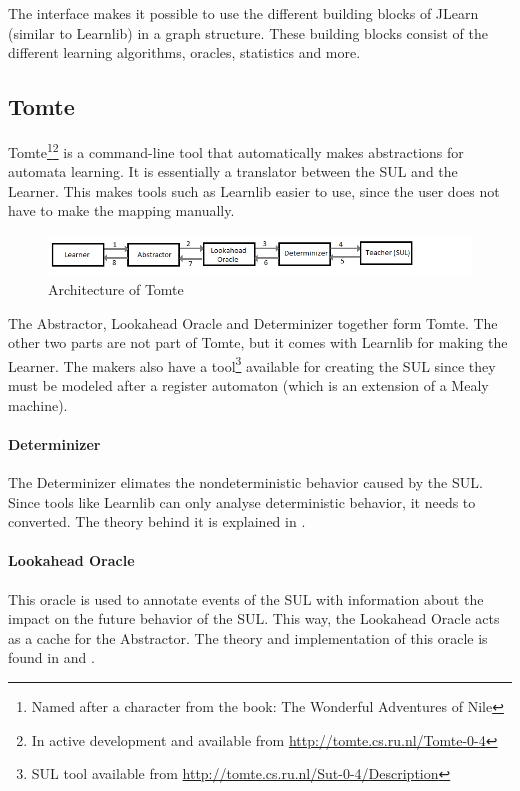 \documentclass[multi,crop=false,class=article]{standalone}
\begin{document}
The interface makes it possible to use the different building blocks of 
JLearn (similar to Learnlib) in a graph structure. These building blocks 
consist of the different learning algorithms, oracles, statistics and more. 


\subsection{Tomte}
\label{ssec:tomte}

Tomte\footnote{Named after a character from the book: The Wonderful Adventures 
of Nile}\footnote{In active development and available from
\url{http://tomte.cs.ru.nl/Tomte-0-4}} is a command-line tool that 
automatically makes abstractions for automata learning.  It is essentially a 
translator between the SUL and the Learner. This makes 
tools such as Learnlib easier to use, since the user does not have to make the 
mapping manually.

\begin{figure}[!h]
	\includegraphics[width=\textwidth]{Tool_images/tomte_network.png}
	\caption{Architecture of Tomte}
	\label{fig:tomte_arch_interaction}
\end{figure}

The Abstractor, Lookahead Oracle and Determinizer together form Tomte. The
other two parts are not part of Tomte, but it comes with Learnlib for making
the Learner. The makers also have a tool\footnote{SUL tool available from
\url{http://tomte.cs.ru.nl/Sut-0-4/Description}} available for creating the SUL
since they must be modeled after a register automaton\cite{Aarts2015}
(which is an extension of a Mealy machine).

\paragraph{Determinizer} The Determinizer elimates the nondeterministic
behavior caused by the SUL. Since tools like Learnlib can only analyse
deterministic behavior, it needs to converted. The theory behind it is
explained in \cite[p. 172]{Aarts2015}.

\paragraph{Lookahead Oracle} This oracle is used to annotate events of the SUL
with information about the impact on the future behavior of the SUL. This way,
the Lookahead Oracle acts as a cache for the Abstractor. The theory and
implementation of this oracle is found in \cite[p. 170]{Aarts2014} and
\cite[p. 105]{Tomte2014}.
\end{document}
